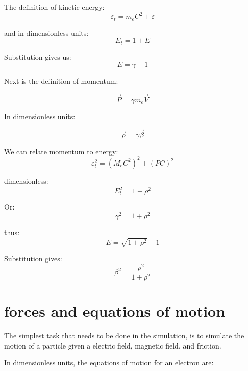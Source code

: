 \documentclass[]{article}
\begin{document}
The definition of kinetic energy:
\begin{equation}
\varepsilon_t = m_e C^2 + \varepsilon
\end{equation}

and in dimensionless units:
\begin{equation}
E_t = 1 + E
\end{equation}

Substitution gives us:
\begin{equation}
E=\gamma-1
\end{equation}

Next is the definition of momentum:

\begin{equation}
\vec{P} = \gamma m_e \vec{V}
\end{equation}

In dimensionless units:

\begin{equation}
\vec{\rho}= \gamma \vec{\beta}
\end{equation}

We can relate momentum to energy:
\begin{equation}
\varepsilon_t^2=(M_eC^2)^2 + (PC)^2
\end{equation}

dimensionless:
\begin{equation}
E_t^2=1+\rho^2
\end{equation}

Or:
\begin{equation}
\gamma^2=1+\rho^2
\end{equation}

thus:
\begin{equation}
E=\sqrt{1+\rho^2}-1
\end{equation}

Substitution gives:
\begin{equation}
\beta^2=\frac{\rho^2}{1+\rho^2}
\end{equation}


\section{forces and equations of motion}

The simplest task that needs to be done in the simulation, is to simulate the motion of a particle given a electric field, magnetic field, and friction.

In dimensionless units, the equations of motion for an electron are:
\end{document}
